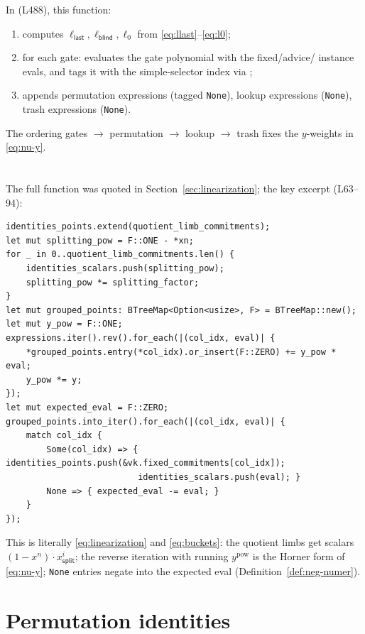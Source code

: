 In  (L488), this function:
\begin{enumerate}[leftmargin=1.4em,itemsep=1pt]
  \item computes $\ell_{\mathsf{last}}, \ell_{\mathsf{blind}}, \ell_0$
        from \eqref{eq:llast}--\eqref{eq:l0};
  \item for each gate: evaluates the gate polynomial with the fixed/advice/
        instance evals, and tags it with the simple-selector index via
        ;
  \item appends permutation expressions (tagged \texttt{None}),
        lookup expressions (\texttt{None}), trash expressions (\texttt{None}).
\end{enumerate}
The ordering gates $\to$ permutation $\to$ lookup $\to$ trash fixes the
$y$-weights in \eqref{eq:nu-y}.

\section{}
\label{sec:lin-com}

The full function was quoted in Section~\ref{sec:linearization}; the key
excerpt (L63--94):
\begin{lstlisting}[style=rust]
identities_points.extend(quotient_limb_commitments);
let mut splitting_pow = F::ONE - *xn;
for _ in 0..quotient_limb_commitments.len() {
    identities_scalars.push(splitting_pow);
    splitting_pow *= splitting_factor;
}
let mut grouped_points: BTreeMap<Option<usize>, F> = BTreeMap::new();
let mut y_pow = F::ONE;
expressions.iter().rev().for_each(|(col_idx, eval)| {
    *grouped_points.entry(*col_idx).or_insert(F::ZERO) += y_pow * eval;
    y_pow *= y;
});
let mut expected_eval = F::ZERO;
grouped_points.into_iter().for_each(|(col_idx, eval)| {
    match col_idx {
        Some(col_idx) => { identities_points.push(&vk.fixed_commitments[col_idx]);
                          identities_scalars.push(eval); }
        None => { expected_eval -= eval; }
    }
});
\end{lstlisting}
This is literally \eqref{eq:linearization} and \eqref{eq:buckets}: the
quotient limbs get scalars $(1-x^n)\cdot x_{\mathsf{split}}^i$; the
reverse iteration with running $y^{\text{pow}}$ is the Horner form of
\eqref{eq:nu-y}; \texttt{None} entries negate into the expected eval
(Definition~\ref{def:neg-numer}).

\section{Permutation identities}
\label{sec:rust-perm}

